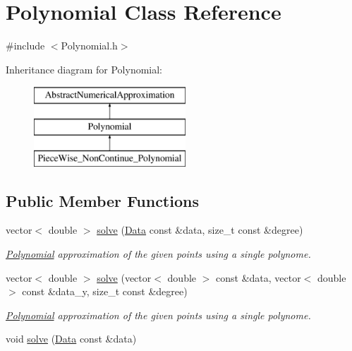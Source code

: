 \hypertarget{class_polynomial}{}\section{Polynomial Class Reference}
\label{class_polynomial}


{\ttfamily \#include $<$Polynomial.\+h$>$}

Inheritance diagram for Polynomial\+:\begin{figure}[H]
\begin{center}
\leavevmode
\includegraphics[height=3.000000cm]{class_polynomial}
\end{center}
\end{figure}
\subsection*{Public Member Functions}
\begin{DoxyCompactItemize}
\item 
vector$<$ double $>$ \mbox{\hyperlink{class_polynomial_a564acf19974e91bcb72d552ee4053691}{solve}} (\mbox{\hyperlink{struct_data}{Data}} const \&data, size\+\_\+t const \&degree)
\begin{DoxyCompactList}\small\item\em \mbox{\hyperlink{class_polynomial}{Polynomial}} approximation of the given points using a single polynome. \end{DoxyCompactList}\item 
vector$<$ double $>$ \mbox{\hyperlink{class_polynomial_ae67730df0a2e45a87c9cb244fe03ad6b}{solve}} (vector$<$ double $>$ const \&data, vector$<$ double $>$ const \&data\+\_\+y, size\+\_\+t const \&degree)
\begin{DoxyCompactList}\small\item\em \mbox{\hyperlink{class_polynomial}{Polynomial}} approximation of the given points using a single polynome. \end{DoxyCompactList}\item 
void \mbox{\hyperlink{class_polynomial_a15351ca59ae2e3a6a8b8b1ec4e23a924}{solve}} (\mbox{\hyperlink{struct_data}{Data}} const \&data)
\end{DoxyCompactItemize}


